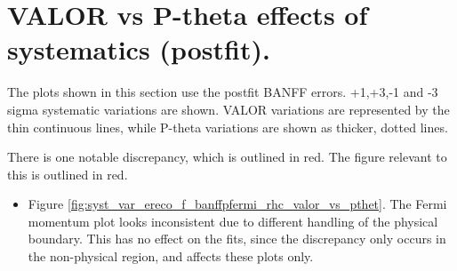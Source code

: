 \documentclass[final]{elsarticle}
\begin{document}
\clearpage

\section{VALOR vs P-theta effects of systematics (postfit).}

The plots shown in this section use the postfit BANFF errors.
+1,+3,-1 and -3 sigma systematic variations are shown.
VALOR variations are represented by the thin continuous lines,
while P-theta variations are shown as thicker, dotted lines.

There is one notable discrepancy, which is outlined in red.
The figure relevant to this is outlined in red.

\begin{itemize}
 \item Figure \ref{fig:syst_var_ereco_f_banffpfermi_rhc_valor_vs_pthet}.
  The Fermi momentum plot looks inconsistent due to different handling of the physical boundary.
  This has no effect on the fits, since the discrepancy only occurs in the non-physical region, and affects these plots only.
\end{itemize}
\end{document}
